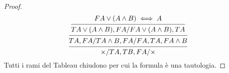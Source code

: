 \begin{proof}
\begin{equation*}
\begin{prooftree}
\hypo{F A \lor (A \land B) \iff A}
\infer1 {T A \lor (A \land B),FA/F A \lor (A \land B),TA}
\infer1 {TA,FA/T A \land B,FA/FA,TA,F A \land B}
\infer1 {\times/TA,TB,FA/\times}
\end{prooftree}
\end{equation*}
Tutti i rami del Tableau chiudono per cui la formula è una tautologia.
\end{proof}
